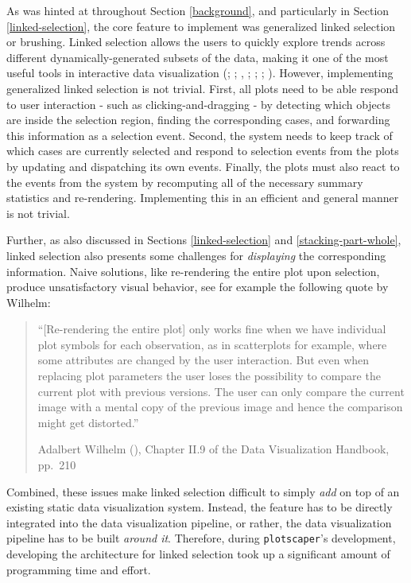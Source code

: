 \documentclass[
  openany]{book}
\theoremstyle{definition}
\theoremstyle{definition}
\theoremstyle{definition}
\theoremstyle{definition}
\theoremstyle{remark}
\begin{document}
As was hinted at throughout Section \ref{background}, and particularly in Section \ref{linked-selection}, the core feature to implement was generalized linked selection or brushing. Linked selection allows the users to quickly explore trends across different dynamically-generated subsets of the data, making it one of the most useful tools in interactive data visualization (; ; , ; ; ; ). However, implementing generalized linked selection is not trivial. First, all plots need to be able respond to user interaction - such as clicking-and-dragging - by detecting which objects are inside the selection region, finding the corresponding cases, and forwarding this information as a selection event. Second, the system needs to keep track of which cases are currently selected and respond to selection events from the plots by updating and dispatching its own events. Finally, the plots must also react to the events from the system by recomputing all of the necessary summary statistics and re-rendering. Implementing this in an efficient and general manner is not trivial.

Further, as also discussed in Sections \ref{linked-selection} and \ref{stacking-part-whole}, linked selection also presents some challenges for \emph{displaying} the corresponding information. Naive solutions, like re-rendering the entire plot upon selection, produce unsatisfactory visual behavior, see for example the following quote by Wilhelm:

\begin{quote}
``{[}Re-rendering the entire plot{]} only works ﬁne when we have individual plot symbols for each observation, as in scatterplots for example, where some attributes are changed by the user interaction. But even when replacing plot parameters the user loses the possibility to compare the current plot with previous versions. The user can only compare the current image with a mental copy of the previous image and hence the comparison might get distorted.''

Adalbert Wilhelm (), Chapter II.9 of the Data Visualization Handbook, pp.~210
\end{quote}

Combined, these issues make linked selection difficult to simply \emph{add} on top of an existing static data visualization system. Instead, the feature has to be directly integrated into the data visualization pipeline, or rather, the data visualization pipeline has to be built \emph{around it}. Therefore, during \texttt{plotscaper}'s development, developing the architecture for linked selection took up a significant amount of programming time and effort.
\end{document}
